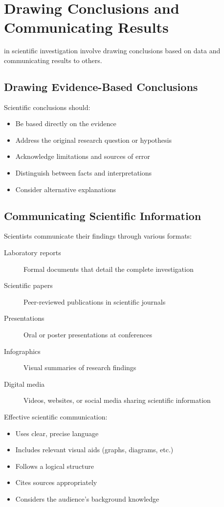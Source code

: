 \documentclass[justified,notoc]{tufte-book}
\newenvironment{keyconcept}[1]{%
    \begin{tcolorbox}[colback=primary!5,colframe=primary,title=\textbf{Key Concept: #1}]
}{%
    \end{tcolorbox}
}
\begin{document}
\section{Drawing Conclusions and Communicating Results}

 in scientific investigation involve drawing conclusions based on data and communicating results to others.

\subsection{Drawing Evidence-Based Conclusions}

Scientific conclusions should:
\begin{itemize}
    \item Be based directly on the evidence
    \item Address the original research question or hypothesis
    \item Acknowledge limitations and sources of error
    \item Distinguish between facts and interpretations
    \item Consider alternative explanations
\end{itemize}

\subsection{Communicating Scientific Information}

Scientists communicate their findings through various formats:

\begin{keyconcept}{Scientific Communication Formats}
\begin{description}
    \item[Laboratory reports] Formal documents that detail the complete investigation
    \item[Scientific papers] Peer-reviewed publications in scientific journals
    \item[Presentations] Oral or poster presentations at conferences
    \item[Infographics] Visual summaries of research findings
    \item[Digital media] Videos, websites, or social media sharing scientific information
\end{description}
\end{keyconcept}

Effective scientific communication:
\begin{itemize}
    \item Uses clear, precise language
    \item Includes relevant visual aids (graphs, diagrams, etc.)
    \item Follows a logical structure
    \item Cites sources appropriately
    \item Considers the audience's background knowledge
\end{itemize}
\end{document}
